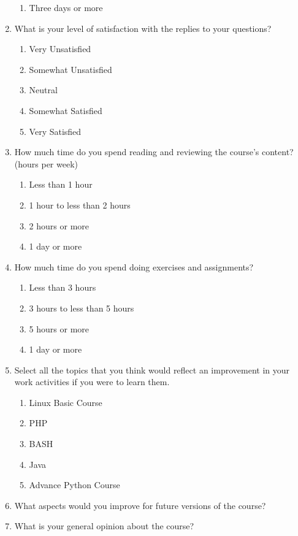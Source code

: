 \documentclass[letter, 10pt]{article}
\begin{document}
\begin{footnotesize}
\begin{enumerate}
\begin{enumerate}
        \item Three days or more
    \end{enumerate}
    \item What is your level of satisfaction with the replies to your questions?
    \begin{enumerate}
        \item Very Unsatisfied
        \item Somewhat Unsatisfied
        \item Neutral
        \item Somewhat Satisfied
        \item Very Satisfied
    \end{enumerate}
    \item How much time do you spend reading and reviewing the course’s content? (hours per week)
    \begin{enumerate}
        \item Less than 1 hour
        \item 1 hour to less than 2 hours
        \item 2 hours or more
        \item 1 day or more
    \end{enumerate}
    \item How much time do you spend doing exercises and assignments?
    \begin{enumerate}
        \item Less than 3 hours
        \item 3 hours to less than 5 hours
        \item 5 hours or more
        \item 1 day or more
    \end{enumerate}
    \item Select all the topics that you think would reflect an improvement in your work activities if you were to learn them.
    \begin{enumerate}
        \item Linux Basic Course
        \item PHP
        \item BASH
        \item Java
        \item Advance Python Course
    \end{enumerate}
    \item What aspects would you improve for future versions of the course?
    \item What is your general opinion about the course?
\end{enumerate}
\end{footnotesize}
\end{document}
